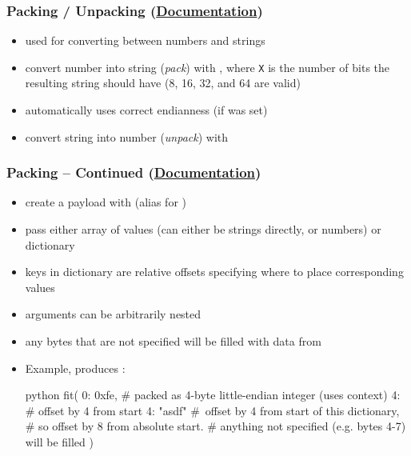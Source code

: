 \documentclass[aspectratio=169]{beamer}
\newcommand{\docl}[1]{(\textbf{\href{#1}{Documentation}})}
\begin{document}
{\begin{frame}[fragile]
    \frametitle{Packing / Unpacking \docl{http://docs.pwntools.com/en/stable/util/packing.html}}
    \begin{itemize}
        \item used for converting between numbers and strings
        \item convert number into string (\textit{pack}) with , where \texttt X is the number of bits the resulting string should have (8, 16, 32, and 64 are valid)
        \item automatically uses correct endianness (if  was set)
        \item convert string into number (\textit{unpack}) with 
    \end{itemize}
\end{frame}
\begin{frame}[fragile]
    \frametitle{Packing -- Continued \docl{http://docs.pwntools.com/en/stable/util/packing.html}}
    \begin{itemize}
    \item create a payload with  (alias for )
    \item pass either array of values (can either be strings directly, or numbers) or dictionary
    \item keys in dictionary are relative offsets specifying where to place corresponding values
    \item arguments can be arbitrarily nested
    \item any bytes that are not specified will be filled with data from 
    \item Example, produces :
            \begin{codebox}{python}
fit({
    0: 0xfe, # packed as 4-byte little-endian integer (uses context)
    4: { # offset by 4 from start
        4: "asdf" # offset by 4 from start of this dictionary,
        # so offset by 8 from absolute start.
        # anything not specified (e.g. bytes 4-7) will be filled
    }
})\end{codebox}
    \end{itemize} 

\end{frame}

}
\end{document}
